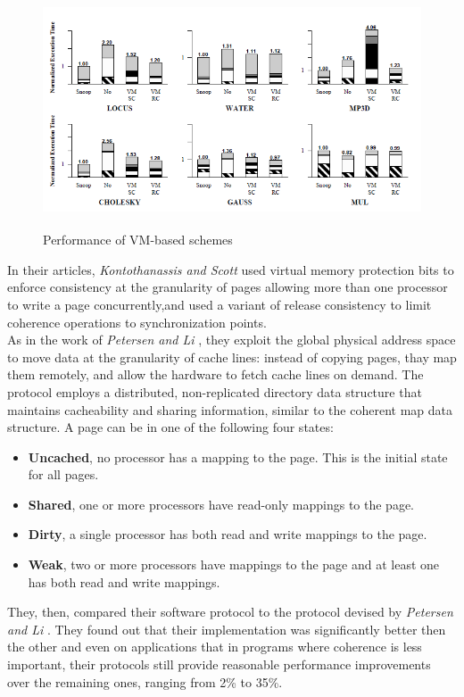 \documentclass[a4paper,10pt]{article}
\begin{document}
\begin{multicols}{2}
\begin{figure}
 \centering
 \includegraphics[width=14cm, height=7cm]{./eps/result1.PNG}
 \caption{Performance of VM-based schemes}
 \label{fig:result1}
\end{figure}

\parindent 10mm In their articles,\emph{ Kontothanassis and Scott} \cite{Kontothanassis94softwarecache} used virtual memory protection bits to enforce consistency at the granularity of pages allowing more than one processor to write a page concurrently,and used a variant of release consistency to limit coherence operations to synchronization points.\\
As in the work of \emph{Petersen and Li} \cite{Li95multiprocessorcache}, they exploit the global physical address space to move data at the granularity of cache lines: instead of copying pages, thay  map them remotely, and allow the hardware to fetch cache lines on demand. The protocol employs a distributed, non-replicated directory data structure that maintains cacheability and sharing information, similar to the coherent map data structure. A page can be in one of the following four states:
\begin{itemize}
    \item \textbf{Uncached}, no processor has a mapping to the page. This
is the initial state for all pages.
    \item \textbf{Shared}, one or more processors have read-only mappings
to the page.
   \item \textbf{Dirty}, a single processor has both read and write mappings
to the page.
   \item \textbf{Weak},  two or more processors have mappings to the page
and at least one has both read and write mappings.
\end{itemize}

They, then, compared their software protocol to the protocol devised by \emph{Petersen and Li} \cite{Li95multiprocessorcache}. They found out that their implementation was significantly better then the other and even on applications that in programs where coherence is less important, their protocols still provide reasonable performance improvements over the remaining ones, ranging from 2\% to 35\%.


\end{multicols}
\end{document}
